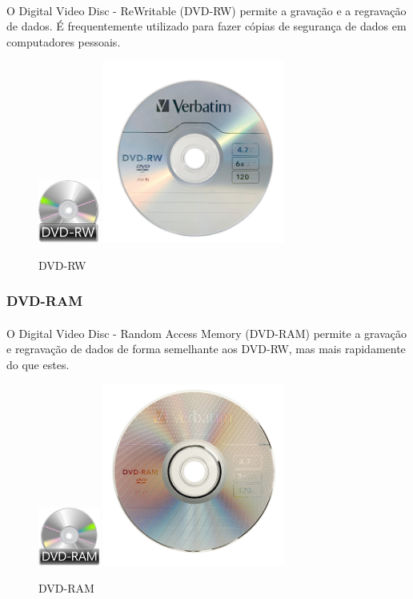 \documentclass[a4paper]{report}
\begin{document}
\paragraph*{}O Digital Video Disc - ReWritable (DVD-RW) permite a gravação e a regravação de dados. É frequentemente utilizado para fazer cópias de segurança de dados em computadores pessoais.

\begin{figure}[H]
\center
\includegraphics[width=2cm]{Imagens/dvd-rw.jpg}
\includegraphics[width=6cm]{Imagens/dvd-rw-ex.jpg}
\caption{DVD-RW}
\end{figure}

\subsubsection{DVD-RAM} 
\paragraph*{}O Digital Video Disc - Random Access Memory (DVD-RAM) permite a gravação e regravação de dados de forma semelhante aos DVD-RW, mas mais rapidamente do que estes. 

\begin{figure}[H]
\center
\includegraphics[width=2cm]{Imagens/dvd-ram.jpg}
\includegraphics[width=6cm]{Imagens/dvd-ram-ex.jpg}
\caption{DVD-RAM}
\end{figure}
\end{document}
